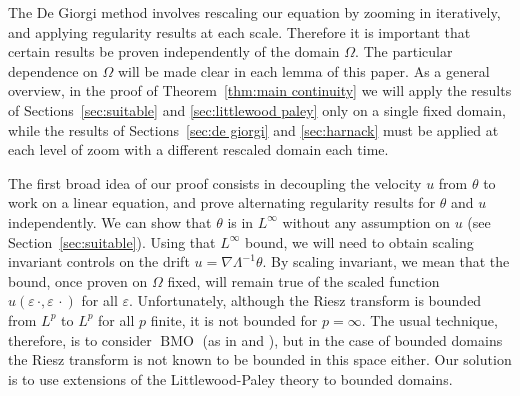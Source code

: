 \documentclass[11pt]{amsart}
\theoremstyle{remark}
\theoremstyle{definition}
\newcommand{\eps}{\varepsilon}
\DeclareMathOperator{\BMO}{BMO}
\newcommand{\grad}{\nabla}
\begin{document}
The De Giorgi method involves rescaling our equation by zooming in iteratively, and applying regularity results at each scale.  Therefore it is important that certain results be proven independently of the domain $\Omega$.  
The particular dependence on $\Omega$ will be made clear in each lemma of this paper.  
As a general overview, in the proof of Theorem~\ref{thm:main continuity} we will apply the results of Sections~\ref{sec:suitable} and \ref{sec:littlewood paley} only on a single fixed domain, while the results of Sections~\ref{sec:de giorgi} and \ref{sec:harnack} must be applied at each level of zoom with a different rescaled domain each time.  

\vskip0.3cm

The first broad  idea of our proof consists in decoupling the  velocity $u$ from  $\theta$ to work on  a linear equation, and prove alternating regularity results for $\theta$ and $u$ independently.  We can show that $\theta$ is in $L^\infty$ without any assumption on $u$ (see Section~\ref{sec:suitable}).  
Using that $L^\infty$ bound, we will need to obtain scaling invariant controls on the drift   $u = \grad \Lambda^{-1} \theta$.  By scaling invariant, we mean that the bound, once proven on $\Omega$ fixed, will remain true of the scaled function $u(\eps \, \cdot, \eps \, \cdot)$ for all $\eps$.  
Unfortunately, although the Riesz transform is bounded from $L^p$ to $L^p$ for all $p$ finite, it is not bounded for $p = \infty$.  
The usual technique, therefore, is to consider $\BMO$ (as in \cite{CaVa.sqg} and \cite{NoVa.qg}), but in the case of bounded domains the Riesz transform is not known to be bounded in this space either.  Our solution is to use extensions of the Littlewood-Paley theory to bounded domains. 
\end{document}
